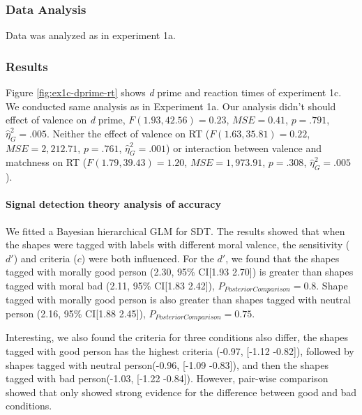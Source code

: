 \documentclass[
  english,
  man]{apa6}
\let\oldparagraph\paragraph
\renewcommand{\paragraph}[1]{\oldparagraph{#1}\mbox{}}
\begin{document}
\hypertarget{data-analysis-3}{%
\subsubsection{Data Analysis}\label{data-analysis-3}}

Data was analyzed as in experiment 1a.

\hypertarget{results-2}{%
\subsubsection{Results}\label{results-2}}

Figure \ref{fig:ex1c-dprime-rt} shows \emph{d} prime and reaction times of experiment 1c. We conducted same analysis as in Experiment 1a. Our analysis didn't should effect of valence on \emph{d} prime, \(F(1.93, 42.56) = 0.23\), \(\mathit{MSE} = 0.41\), \(p = .791\), \(\hat{\eta}^2_G = .005\). Neither the effect of valence on RT (\(F(1.63, 35.81) = 0.22\), \(\mathit{MSE} = 2,212.71\), \(p = .761\), \(\hat{\eta}^2_G = .001\)) or interaction between valence and matchness on RT (\(F(1.79, 39.43) = 1.20\), \(\mathit{MSE} = 1,973.91\), \(p = .308\), \(\hat{\eta}^2_G = .005\)).

\hypertarget{signal-detection-theory-analysis-of-accuracy-1}{%
\paragraph{Signal detection theory analysis of accuracy}\label{signal-detection-theory-analysis-of-accuracy-1}}

We fitted a Bayesian hierarchical GLM for SDT. The results showed that when the shapes were tagged with labels with different moral valence, the sensitivity (\(d'\)) and criteria (\(c\)) were both influenced. For the \(d'\), we found that the shapes tagged with morally good person (2.30, 95\% CI{[}1.93 2.70{]}) is greater than shapes tagged with moral bad (2.11, 95\% CI{[}1.83 2.42{]}), \(P_{PosteriorComparison} = 0.8\). Shape tagged with morally good person is also greater than shapes tagged with neutral person (2.16, 95\% CI{[}1.88 2.45{]}), \(P_{PosteriorComparison} = 0.75\).

Interesting, we also found the criteria for three conditions also differ, the shapes tagged with good person has the highest criteria (-0.97, {[}-1.12 -0.82{]}), followed by shapes tagged with neutral person(-0.96, {[}-1.09 -0.83{]}), and then the shapes tagged with bad person(-1.03, {[}-1.22 -0.84{]}). However, pair-wise comparison showed that only showed strong evidence for the difference between good and bad conditions.
\end{document}
